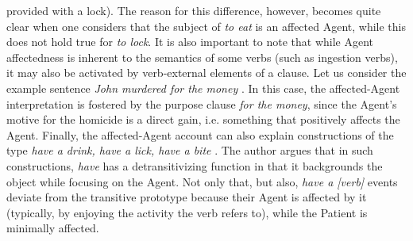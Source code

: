 provided with a lock). The reason for this difference, however, becomes quite clear when one considers that the subject of \textit{to eat} is an affected Agent, while this does not hold true for \textit{to lock}. It is also important to note that while Agent affectedness is inherent to the semantics of some verbs (such as ingestion verbs), it may also be activated by verb-external elements of a clause. Let us consider the example sentence \textit{John murdered for the money} \parencite[136]{Naess2007}. In this case, the affected-Agent interpretation is fostered by the purpose clause \textit{for the money}, since the Agent's motive for the homicide is a direct gain, i.e. something that positively affects the Agent. Finally, the affected-Agent account can also explain constructions of the type \textit{have a drink, have a lick, have a bite} \parencite[758, 771]{Wierzbicka1982}. The author argues that in such constructions, \textit{have} has a detransitivizing function in that it backgrounds the object while focusing on the Agent. Not only that, but also, \textit{have a [verb]} events deviate from the transitive prototype because their Agent is affected by it (typically, by enjoying the activity the verb refers to), while the Patient is minimally affected.\\
